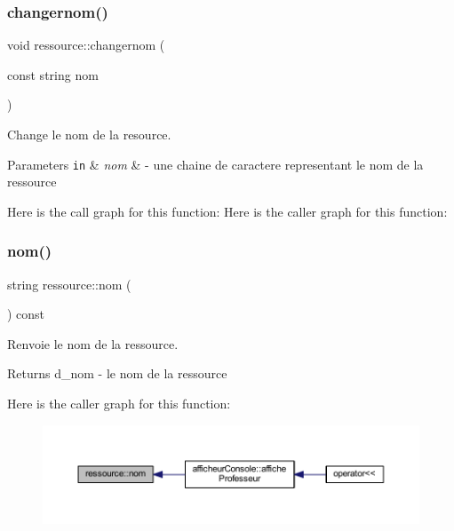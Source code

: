 \subsubsection{\texorpdfstring{changernom()}{changernom()}}
{\footnotesize\ttfamily void ressource\+::changernom (\begin{DoxyParamCaption}\item[{const string}]{nom }\end{DoxyParamCaption})}



Change le nom de la resource. 


\begin{DoxyParams}[1]{Parameters}
\mbox{\tt in}  & {\em nom} & -\/ une chaine de caractere representant le nom de la ressource \\
\hline
\end{DoxyParams}
Here is the call graph for this function\+:
Here is the caller graph for this function\+:
\hypertarget{classressource_aff712b6d732b3f4091dd29f4349aba85}{}\label{classressource_aff712b6d732b3f4091dd29f4349aba85} 
\subsubsection{\texorpdfstring{nom()}{nom()}}
{\footnotesize\ttfamily string ressource\+::nom (\begin{DoxyParamCaption}{ }\end{DoxyParamCaption}) const}



Renvoie le nom de la ressource. 

\begin{DoxyReturn}{Returns}
d\+\_\+nom -\/ le nom de la ressource 
\end{DoxyReturn}
Here is the caller graph for this function\+:\nopagebreak
\begin{figure}[H]
\begin{center}
\leavevmode
\includegraphics[width=350pt]{classressource_aff712b6d732b3f4091dd29f4349aba85_icgraph}
\end{center}
\end{figure}
\hypertarget{classressource_aed676709f755431a3cb2a5972bdbf0c0}{}\label{classressource_aed676709f755431a3cb2a5972bdbf0c0} 
